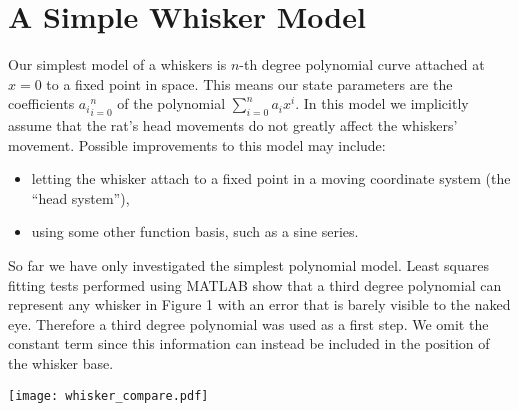 \section*{A Simple Whisker Model}

Our simplest model of a whiskers is $n$-th degree polynomial curve attached at $x=0$ to a fixed point in space. This means our state parameters are the coefficients ${a_i}_{i=0}^n$ of the polynomial $\sum_{i=0}^n a_ix^i$. In this model we implicitly assume that the rat's head movements do not greatly affect the whiskers' movement. Possible improvements to this model may include:
\begin{itemize}
  \item letting the whisker attach to a fixed point in a moving coordinate system (the ``head system''),
  \item using some other function basis, such as a sine series.
\end{itemize}

So far we have only investigated the simplest polynomial model. Least squares fitting tests performed using MATLAB show that a third degree polynomial can represent any whisker in Figure 1 with an error that is barely visible to the naked eye. Therefore a third degree polynomial was used as a first step. We omit the constant term since this information can instead be included in the position of the whisker base.

\begin{center}
  \texttt{[image: whisker\_compare.pdf]}
\end{center}
